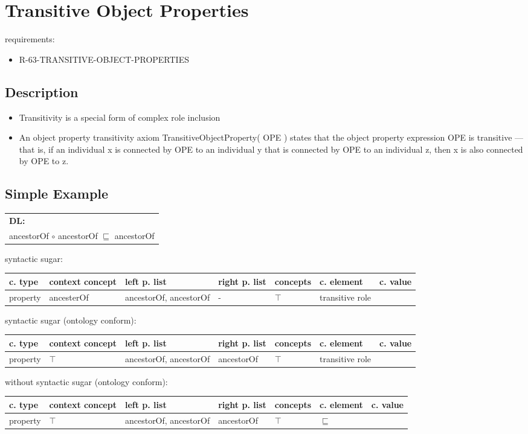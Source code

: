 \documentclass{llncs}
\newenvironment{gcotable}{
  \scriptsize
  \sffamily
  \vspace{0.3cm}
  \begin{tabular}{l|l|l|l|l|l|l}
  \hline
  \textbf{c. type} & \textbf{context concept} & \textbf{left p. list} & \textbf{right p. list} & \textbf{concepts} & \textbf{c. element} & \textbf{c. value} \\
  \hline

}{
  \hline
  \end{tabular}
  \linebreak
}
\newenvironment{DL}{
  \scriptsize
  \sffamily
  \vspace{0.3cm}
  \begin{tabular}{l}
	\textbf{DL:} \\

}{
  \end{tabular}
  \linebreak
}
\begin{document}
\section{Transitive Object Properties}

requirements:

\begin{itemize}
	\item R-63-TRANSITIVE-OBJECT-PROPERTIES
\end{itemize}

\subsection{Description}

\begin{itemize}
	\item Transitivity is a special form of complex role inclusion
	\item An object property transitivity axiom TransitiveObjectProperty( OPE ) states that the object property expression OPE is transitive — that is, if an individual x is connected by OPE to an individual y that is connected by OPE to an individual z, then x is also connected by OPE to z.
\end{itemize}

\subsection{Simple Example}

\begin{DL}
ancestorOf $\circ$ ancestorOf $\sqsubseteq$ ancestorOf
\end{DL}

syntactic sugar:

\begin{gcotable}
property & ancesterOf & ancestorOf, ancestorOf & - & $\top$ & transitive role \\
\end{gcotable}

syntactic sugar (ontology conform):

\begin{gcotable}
property & $\top$ & ancestorOf, ancestorOf & ancestorOf & $\top$ & transitive role \\
\end{gcotable}

without syntactic sugar (ontology conform):

\begin{gcotable}
property & $\top$ & ancestorOf, ancestorOf & ancestorOf & $\top$ & $\sqsubseteq$ \\
\end{gcotable}
\end{document}
